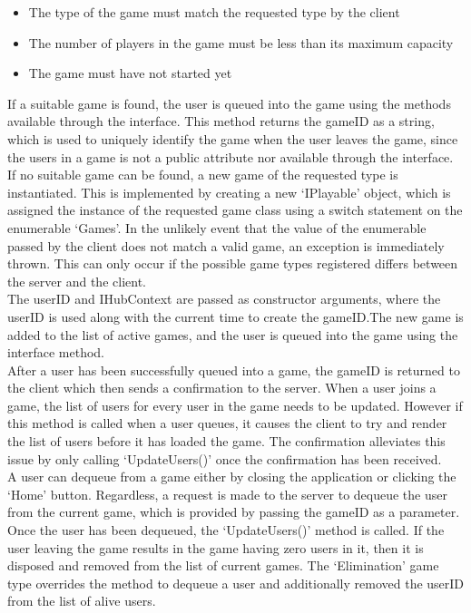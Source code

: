 \documentclass{article}
\begin{document}
\begin{itemize}
    \item The type of the game must match the requested type by the client
    \item The number of players in the game must be less than its maximum capacity
    \item The game must have not started yet
\end{itemize}

If a suitable game is found, the user is queued into the game using the methods available through the interface. This method returns the gameID as a string, which is used to uniquely identify the game when the user leaves the game, since the users in a game is not a public attribute nor available through the interface. \\

If no suitable game can be found, a new game of the requested type is instantiated. This is implemented by creating a new `IPlayable' object, which is assigned the instance of the requested game class using a switch statement on the enumerable `Games'. In the unlikely event that the value of the enumerable passed by the client does not match a valid game, an exception is immediately thrown. This can only occur if the possible game types registered differs between the server and the client. \\

The userID and IHubContext are passed as constructor arguments, where the userID is used along with the current time to create the gameID.\@ The new game is added to the list of active games, and the user is queued into the game using the interface method. \\

After a user has been successfully queued into a game, the gameID is returned to the client which then sends a confirmation to the server. When a user joins a game, the list of users for every user in the game needs to be updated. However if this method is called when a user queues, it causes the client to try and render the list of users before it has loaded the game. The confirmation alleviates this issue by only calling `UpdateUsers()' once the confirmation has been received. \\

A user can dequeue from a game either by closing the application or clicking the `Home' button. Regardless, a request is made to the server to dequeue the user from the current game, which is provided by passing the gameID as a parameter. Once the user has been dequeued, the `UpdateUsers()' method is called. If the user leaving the game results in the game having zero users in it, then it is disposed and removed from the list of current games. The `Elimination' game type overrides the method to dequeue a user and additionally removed the userID from the list of alive users.
\end{document}
